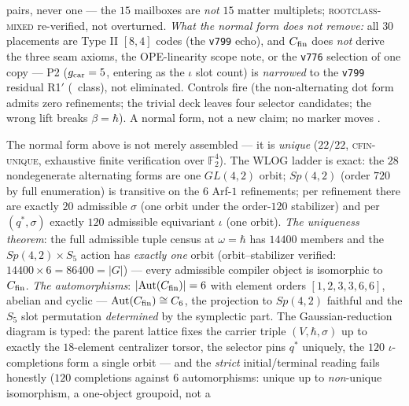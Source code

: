 \begin{keybox}[The finite compiler normal form $C_{\rm fin}=(V,\hbar,q^{*},\sigma,\iota)$ (2026-08-07) --- one object, the kill built in \mE\ (\veri{v845\_cfin\_normal\_form.py})]
pairs, never one --- the $15$ mailboxes are \emph{not} $15$
matter multiplets; \textsc{rootclass-mixed} re-verified, not
overturned.  \emph{What the normal form does not remove:} all
$30$ placements are Type II $[8,4]$ codes (the \texttt{v799}
echo), and $C_{\rm fin}$ does \emph{not} derive the three seam
axioms, the OPE-linearity scope note, or the \texttt{v776}
selection of one copy --- P2 ($g_{\mathrm{car}} = 5$, entering as the
$\iota$ slot count) is \emph{narrowed} to the \texttt{v799}
residual R1$'$ (\mC\ class), not eliminated.  Controls fire (the
non-alternating dot form admits zero refinements; the trivial
deck leaves four selector candidates; the wrong lift breaks
$\beta = \hbar$).  A normal form, not a new claim; no marker
moves \mE.
\end{keybox}

\begin{keybox}
The normal form above is not merely assembled --- it is
\emph{unique} ($22/22$, \textsc{cfin-unique}, exhaustive finite
verification over $\mathbb{F}_2^4$).  The WLOG ladder is exact: the $28$
nondegenerate alternating forms are one $GL(4,2)$ orbit;
$Sp(4,2)$ (order $720$ by full enumeration) is transitive on the
$6$ Arf-$1$ refinements; per refinement there are exactly $20$
admissible $\sigma$ (one orbit under the order-$120$ stabilizer)
and per $(q^{*},\sigma)$ exactly $120$ admissible equivariant
$\iota$ (one orbit).  \emph{The uniqueness theorem}: the full
admissible tuple census at $\omega = \hbar$ has $14400$ members
and the $Sp(4,2)\times S_5$ action has \emph{exactly one} orbit
(orbit--stabilizer verified: $14400 \times 6 = 86400 =
\lvert G\rvert$) --- every admissible compiler object is
isomorphic to $C_{\rm fin}$.  \emph{The automorphisms}:
$\lvert\mathrm{Aut}(C_{\rm fin})\rvert = 6$ with element orders
$[1,2,3,3,6,6]$, abelian and cyclic --- $\mathrm{Aut}(C_{\rm
fin}) \cong C_6$, the projection to $Sp(4,2)$ faithful and the
$S_5$ slot permutation \emph{determined} by the symplectic part.
The Gaussian-reduction diagram is typed: the parent lattice fixes
the carrier triple $(V, \hbar, \sigma)$ up to exactly the
$18$-element centralizer torsor, the selector pins $q^{*}$
uniquely, the $120$ $\iota$-completions form a single orbit ---
and the \emph{strict} initial/terminal reading fails honestly
($120$ completions against $6$ automorphisms: unique up to
\emph{non}-unique isomorphism, a one-object groupoid, not a

\end{keybox}

